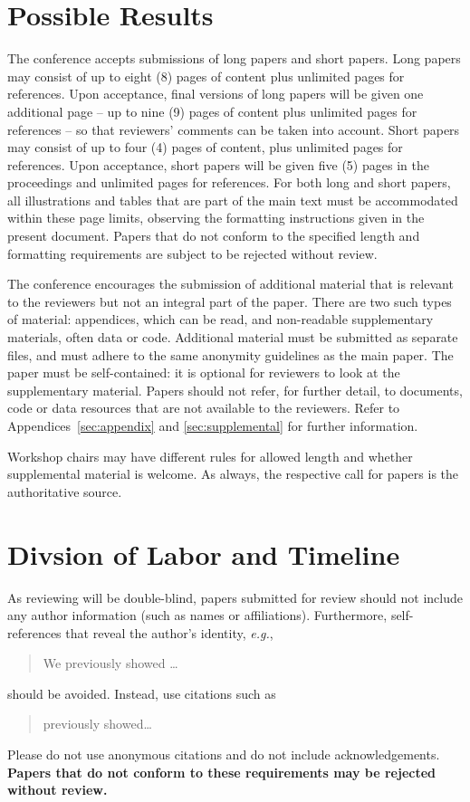 \documentclass[11pt,a4paper]{article}
\begin{document}
\section{Possible Results}
\label{sec:length}

The conference accepts submissions of long papers and short papers.
Long papers may consist of up to eight (8) pages of content plus unlimited pages for references.
Upon acceptance, final versions of long papers will be given one additional page -- up to nine (9) pages of content plus unlimited pages for references -- so that reviewers' comments can be taken into account.
Short papers may consist of up to four (4) pages of content, plus unlimited pages for references.
Upon acceptance, short papers will be given five (5) pages in the proceedings and unlimited pages for references. 
For both long and short papers, all illustrations and tables that are part of the main text must be accommodated within these page limits, observing the formatting instructions given in the present document.
Papers that do not conform to the specified length and formatting requirements are subject to be rejected without review.

The conference encourages the submission of additional material that is relevant to the reviewers but not an integral part of the paper.
There are two such types of material: appendices, which can be read, and non-readable supplementary materials, often data or code.
Additional material must be submitted as separate files, and must adhere to the same anonymity guidelines as the main paper.
The paper must be self-contained: it is optional for reviewers to look at the supplementary material.
Papers should not refer, for further detail, to documents, code or data resources that are not available to the reviewers.
Refer to Appendices~\ref{sec:appendix} and \ref{sec:supplemental} for further information. 

Workshop chairs may have different rules for allowed length and whether supplemental material is welcome.
As always, the respective call for papers is the authoritative source.


\section{Divsion of Labor and Timeline}
As reviewing will be double-blind, papers submitted for review should not include any author information (such as names or affiliations). Furthermore, self-references that reveal the author's identity, \emph{e.g.},
\begin{quote}
We previously showed \citep{Gusfield:97} \ldots
\end{quote}
should be avoided. Instead, use citations such as 
\begin{quote}
\citet{Gusfield:97} previously showed\ldots
\end{quote}
Please do not use anonymous citations and do not include acknowledgements.
\textbf{Papers that do not conform to these requirements may be rejected without review.}
\end{document}
